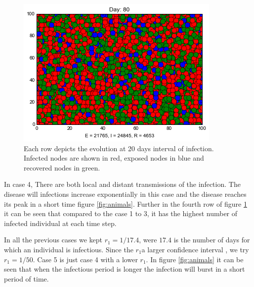 \begin{figure}[h]
\includegraphics[scale=0.28]{images/5t80.png} 

\caption{Each row depicts the evolution at 20 days interval of infection. Infected nodes are shown in red, exposed nodes in blue and recovered nodes in green.}
\label{pics:res}
\end{figure}

In case 4, There are both local and distant transmissions of the infection. The disease will infections increase exponentially in this case and the disease reaches its peak in a short time figure \ref{fig:animals}. Further in the fourth row of figure \ref{pics:res} it can be seen that compared to the case 1 to 3, it has the highest number of infected individual at each time step.

In all the previous cases we kept $r_1 = 1/17.4$, were $17.4$ is the number of days for which an individual is infectious. Since the $r_1$a larger confidence interval \citep{lessler2016times}, we try  $r_1 = 1/50$. Case 5 is just case 4 with a lower $r_1$. In figure \ref{fig:animals} it can be seen that when the infectious period is longer the infection will burst in a short period of time.
